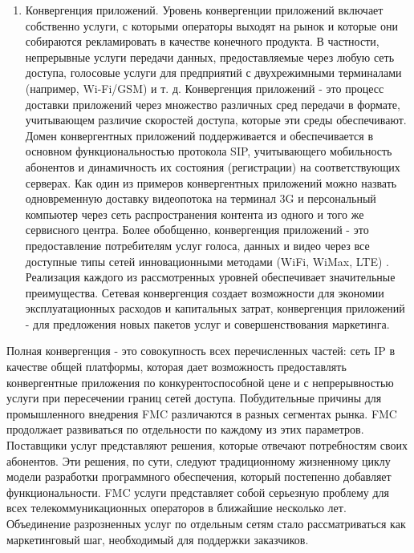 \begin{enumerate}
\item Конвергенция приложений. Уровень конвергенции приложений включает собственно услуги, с которыми операторы выходят на рынок и которые они собираются рекламировать в качестве конечного продукта. В частности, непрерывные услуги передачи данных, предоставляемые через любую сеть доступа, голосовые услуги для предприятий с двухрежимными терминалами (например, Wi-Fi/GSM) и т. д. Конвергенция приложений - это процесс доставки приложений через множество различных сред передачи в формате, учитывающем различие скоростей доступа, которые эти среды обеспечивают. Домен конвергентных приложений поддерживается и обеспечивается в основном функциональностью протокола SIP, учитывающего мобильность абонентов и динамичность их состояния (регистрации) на соответствующих серверах. Как один из примеров конвергентных приложений можно назвать одновременную доставку видеопотока на терминал 3G и персональный компьютер через сеть распространения контента из одного и того же сервисного центра. Более обобщенно, конвергенция приложений - это предоставление потребителям услуг голоса, данных и видео через все доступные типы сетей инновационными методами (WiFi, WiMax, LTE) . Реализация каждого из рассмотренных уровней обеспечивает значительные преимущества. Сетевая конвергенция создает возможности для экономии эксплуатационных расходов и капитальных затрат, конвергенция приложений - для предложения новых пакетов услуг и совершенствования маркетинга.

\end{enumerate}

Полная конвергенция - это совокупность всех перечисленных частей: сеть IP в качестве общей платформы, которая дает возможность предоставлять конвергентные приложения по конкурентоспособной цене и с непрерывностью услуги при пересечении границ сетей доступа. Побудительные причины для промышленного внедрения FMC различаются в разных сегментах рынка. FMC продолжает развиваться по отдельности по каждому из этих параметров. Поставщики услуг представляют решения, которые отвечают потребностям своих абонентов. Эти решения, по сути, следуют традиционному жизненному циклу модели разработки программного обеспечения, который постепенно добавляет функциональности.
FMC услуги представляет собой серьезную проблему для всех телекоммуникационных операторов в ближайшие несколько лет. Объединение разрозненных услуг по отдельным сетям стало рассматриваться как маркетинговый шаг, необходимый для поддержки заказчиков.



